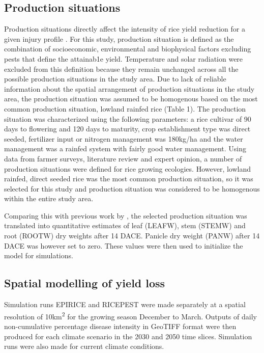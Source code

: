 \documentclass[preprint,12pt]{elsarticle}
\begin{document}
\subsection{Production situations}
Production situations directly affect the intensity of rice yield reduction for a given injury profile \cite{Savary2000}. For this study, production situation is defined as the combination of socioeconomic, environmental and biophysical factors excluding pests that define the attainab1e yield. Temperature and solar radiation were excluded from this definition because they remain unchanged across all the possible production situations in the study area. Due to lack of reliable information about the spatial arrangement of production situations in the study area, the production situation was assumed to be homogenous based on the most common production situation, lowland rainfed rice \cite{Diagne2013} (Table 1). The production situation was characterized using the following parameters: a rice cultivar of 90 days to flowering and 120 days to maturity, crop establishment type was direct seeded, fertilizer input or nitrogen management was 180kg/ha and the water management was a rainfed system with fairly good water management. Using data from farmer surveys, literature review and expert opinion, a number of production situations were defined for rice growing ecologies. However, lowland rainfed, direct seeded rice was the most common production situation, so it  was selected for this study and production situation was considered to be homogenous within the entire study area. 

Comparing this with previous work by \citet{Willocquet2002}, the selected production situation was translated into quantitative estimates of leaf (LEAFW), stem (STEMW) and root (ROOTW) dry weights after 14 DACE. Panicle dry weight (PANW) after 14 DACE was however set to zero. These values were then used to initialize the model for simulations. 

\subsection{Spatial modelling of yield loss}
Simulation runs EPIRICE and RICEPEST were made separately at a spatial resolution of 10km\textsuperscript{2} for the growing season December to March. Outputs of daily non-cumulative percentage disease intensity in GeoTIFF format were then produced for each climate scenario in the 2030 and 2050 time slices. Simulation runs were also made for current climate conditions.
\end{document}

